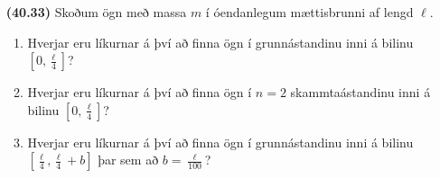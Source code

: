 \begin{enumerate}[label = \textbf{(\alph*)}]
\item[\textbf{(40.33)}] Skoðum ögn með massa $m$ í óendanlegum mættisbrunni af lengd $\ell$. 
\begin{enumerate}[label = \textbf{(\alph*)}]
    \item Hverjar eru líkurnar á því að finna ögn í grunnástandinu inni á bilinu $[0,\frac{\ell}{4}]$?
    \item Hverjar eru líkurnar á því að finna ögn í $n = 2$ skammtaástandinu inni á bilinu $[0,\frac{\ell}{4}]$?
    \item Hverjar eru líkurnar á því að finna ögn í grunnástandinu inni á bilinu $[\frac{\ell}{4}, \frac{\ell}{4} + b]$ þar sem að $b = \frac{\ell}{100}$?
\end{enumerate}

\begin{tcolorbox}
\end{tcolorbox}



\end{enumerate}

\newpage